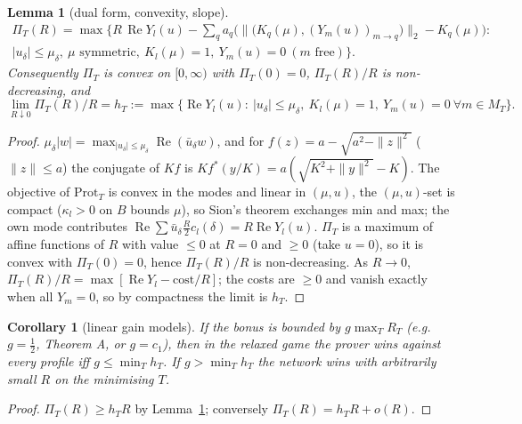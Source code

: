 \documentclass[11pt]{article}
\newtheorem{lemma}[theorem]{Lemma}
\newtheorem{corollary}[theorem]{Corollary}
\theoremstyle{definition}
\renewcommand{\Re}{\operatorname{Re}}
\begin{document}
\begin{lemma}[dual form, convexity, slope]\label{lem:dual}
\begin{multline*}\Pi_T(R)=\max\Big\{R\,\Re Y_l(u)-\sum_{q}a_q\Big(\big\|\big(K_q(\mu),(Y_m(u))_{m\to q}\big)\big\|_2-K_q(\mu)\Big):\\ |u_\delta|\le\mu_\delta,\ \mu\text{ symmetric},\ K_l(\mu)=1,\ Y_m(u)=0\ (m\text{ free})\Big\}.\end{multline*}
Consequently $\Pi_T$ is convex on $[0,\infty)$ with $\Pi_T(0)=0$, $\Pi_T(R)/R$ is non-decreasing, and
\[\lim_{R\downarrow0}\Pi_T(R)/R=h_T:=\max\{\Re Y_l(u):\ |u_\delta|\le\mu_\delta,\ K_l(\mu)=1,\ Y_m(u)=0\ \forall m\in M_T\}.\]
\end{lemma}
\begin{proof}
$\mu_\delta|w|=\max_{|u_\delta|\le\mu_\delta}\Re(\bar u_\delta w)$, and for $f(z)=a-\sqrt{a^2-\|z\|^2}$ ($\|z\|\le a$) the conjugate of $Kf$ is
$K f^*(y/K)=a(\sqrt{K^2+\|y\|^2}-K)$.  The objective of $\mathrm{Prot}_T$ is convex in the modes and linear in $(\mu,u)$, the $(\mu,u)$-set is compact
($\kappa_l>0$ on $B$ bounds $\mu$), so Sion's theorem exchanges min and max; the own mode contributes $\Re\sum\bar u_\delta\frac R2c_l(\delta)=R\Re Y_l(u)$.
$\Pi_T$ is a maximum of affine functions of $R$ with value $\le0$ at $R=0$ and $\ge0$ (take $u=0$), so it is convex with $\Pi_T(0)=0$, hence
$\Pi_T(R)/R$ is non-decreasing.  As $R\to0$, $\Pi_T(R)/R=\max[\Re Y_l-\text{cost}/R]$; the costs are $\ge0$ and vanish exactly when all $Y_m=0$, so by
compactness the limit is $h_T$.
\end{proof}

\begin{corollary}[linear gain models]\label{cor:lin}
If the bonus is bounded by $g\max_TR_T$ (e.g.\ $g=\frac12$, Theorem A, or $g=c_1$), then in the relaxed game the prover wins against every profile iff
$g\le\min_Th_T$.  If $g>\min_Th_T$ the network wins with arbitrarily small $R$ on the minimising $T$.
\end{corollary}
\begin{proof}
$\Pi_T(R)\ge h_TR$ by Lemma~\ref{lem:dual}; conversely $\Pi_T(R)=h_TR+o(R)$.
\end{proof}
\end{document}
